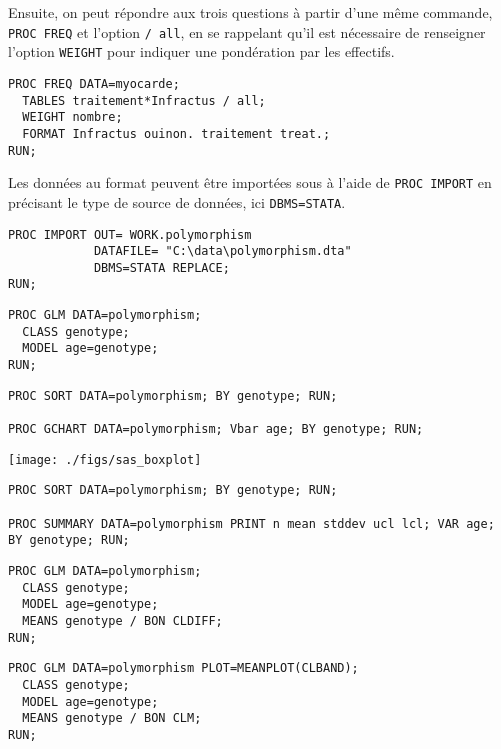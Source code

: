 Ensuite, on peut répondre aux trois questions à partir d'une même commande,
\texttt{PROC FREQ} et l'option \texttt{/ all}, en se rappelant qu'il est
nécessaire de renseigner l'option \texttt{WEIGHT} pour indiquer une
pondération par les effectifs.
\begin{verbatim}
PROC FREQ DATA=myocarde;
  TABLES traitement*Infractus / all;
  WEIGHT nombre;
  FORMAT Infractus ouinon. traitement treat.;
RUN;
\end{verbatim}
%
%
%
\soln{\ref{exo:9.5}}
Les données au format \Stata peuvent être importées sous \SAS à l'aide de
\texttt{PROC IMPORT} en précisant le type de source de données, ici
\texttt{DBMS=STATA}.
\begin{verbatim}
PROC IMPORT OUT= WORK.polymorphism
            DATAFILE= "C:\data\polymorphism.dta"
            DBMS=STATA REPLACE;
RUN;
\end{verbatim}


\begin{verbatim}
PROC GLM DATA=polymorphism; 
  CLASS genotype; 
  MODEL age=genotype; 
RUN;
\end{verbatim}


\begin{verbatim}
PROC SORT DATA=polymorphism; BY genotype; RUN;

PROC GCHART DATA=polymorphism; Vbar age; BY genotype; RUN;
\end{verbatim}


\texttt{[image: ./figs/sas\_boxplot]}

\begin{verbatim}
PROC SORT DATA=polymorphism; BY genotype; RUN;

PROC SUMMARY DATA=polymorphism PRINT n mean stddev ucl lcl; VAR age; BY genotype; RUN;
\end{verbatim}

\begin{verbatim}
PROC GLM DATA=polymorphism; 
  CLASS genotype; 
  MODEL age=genotype;
  MEANS genotype / BON CLDIFF;
RUN;
\end{verbatim}

\begin{verbatim}
PROC GLM DATA=polymorphism PLOT=MEANPLOT(CLBAND); 
  CLASS genotype; 
  MODEL age=genotype;
  MEANS genotype / BON CLM;
RUN;
\end{verbatim}